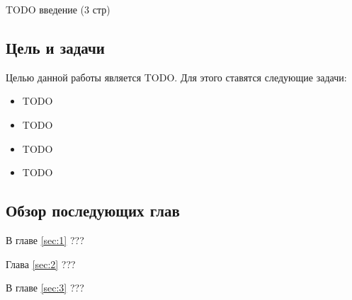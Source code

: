 \documentclass[../diploma.tex]{subfiles}
\begin{document}
 \label{sec:introduction}

TODO введение (3 стр)

\subsection*{Цель и задачи}

Целью данной работы является TODO. Для этого ставятся следующие задачи:

\begin{itemize}
	\item TODO
	\item TODO
	\item TODO
	\item TODO
\end{itemize}

\subsection*{Обзор последующих глав}

В главе \ref{sec:1} ???

Глава \ref{sec:2} ???

В главе \ref{sec:3} ???
\end{document}
